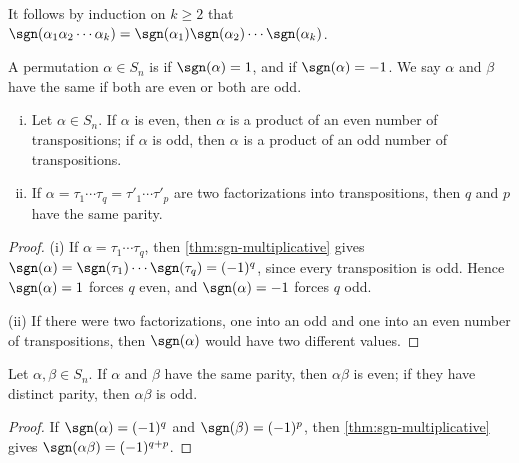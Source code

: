 It follows by induction on \(k \geq 2\) that
\(\sgn(\alpha_1\alpha_2\cdots\alpha_k) = \sgn(\alpha_1)\sgn(\alpha_2)\cdots\sgn(\alpha_k)\).

\begin{definition}
	A permutation \(\alpha \in S_n\) is  if \(\sgn(\alpha) = 1\), and
	 if \(\sgn(\alpha) = -1\). We say \(\alpha\) and \(\beta\) have the same
	 if both are even or both are odd.
\end{definition}

\begin{theorem}\label{thm:parity}
	\begin{enumerate}[(i)]
		\item Let \(\alpha \in S_n\). If \(\alpha\) is even, then \(\alpha\) is a product of
		      an even number of transpositions; if \(\alpha\) is odd, then \(\alpha\) is a
		      product of an odd number of transpositions.
		\item If \(\alpha = \tau_1\cdots\tau_q = \tau'_1\cdots\tau'_p\) are two
		      factorizations into transpositions, then \(q\) and \(p\) have the same parity.
	\end{enumerate}
\end{theorem}

\begin{proof}
	(i) If \(\alpha = \tau_1\cdots\tau_q\), then \autoref{thm:sgn-multiplicative} gives
	\(\sgn(\alpha) = \sgn(\tau_1)\cdots\sgn(\tau_q) = (-1)^q\), since every transposition is
	odd. Hence \(\sgn(\alpha) = 1\) forces \(q\) even, and \(\sgn(\alpha) = -1\) forces
	\(q\) odd.

	(ii) If there were two factorizations, one into an odd and one into an even number of
	transpositions, then \(\sgn(\alpha)\) would have two different values.
\end{proof}

\begin{corollary}\label{cor:parity-product}
	Let \(\alpha, \beta \in S_n\). If \(\alpha\) and \(\beta\) have the same parity, then
	\(\alpha\beta\) is even; if they have distinct parity, then \(\alpha\beta\) is odd.
\end{corollary}

\begin{proof}
	If \(\sgn(\alpha) = (-1)^q\) and \(\sgn(\beta) = (-1)^p\), then
	\autoref{thm:sgn-multiplicative} gives \(\sgn(\alpha\beta) = (-1)^{q+p}\).
\end{proof}

